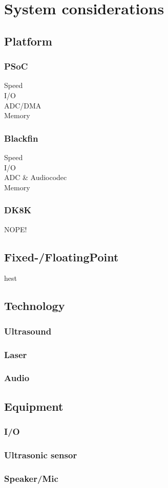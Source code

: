 \chapter{System considerations}
\section{Platform}
\subsection{PSoC}
Speed\\
I/O\\
ADC/DMA\\
Memory\\
\subsection{Blackfin}
Speed\\
I/O\\
ADC \& Audiocodec\\
Memory\\
\subsection{DK8K}
NOPE!\\
\section{Fixed-/FloatingPoint}
hest\
\section{Technology}
\subsection{Ultrasound}
\subsection{Laser}
\subsection{Audio}
\section{Equipment}
\subsection{I/O}
\subsection{Ultrasonic sensor}
\subsection{Speaker/Mic}